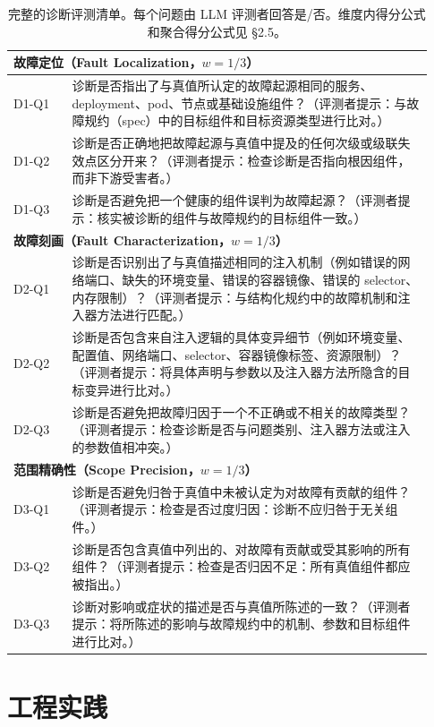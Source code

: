 \documentclass[11pt,UTF8,fontset=fandol]{ctexart}
\begin{document}
\begin{table}[H]\centering
\caption{完整的诊断评测清单。每个问题由 LLM 评测者回答是/否。维度内得分公式和聚合得分公式见 §2.5。}
\label{tab:6}
\renewcommand{\arraystretch}{1.25}
\begin{tabular}{p{0.13\linewidth}p{0.80\linewidth}}
\toprule
\multicolumn{2}{l}{\textbf{故障定位（Fault Localization，$w = 1/3$）}} \\
\midrule
D1-Q1 & 诊断是否指出了与真值所认定的故障起源相同的服务、deployment、pod、节点或基础设施组件？（评测者提示：与故障规约（spec）中的目标组件和目标资源类型进行比对。） \\
D1-Q2 & 诊断是否正确地把故障起源与真值中提及的任何次级或级联失效点区分开来？（评测者提示：检查诊断是否指向根因组件，而非下游受害者。） \\
D1-Q3 & 诊断是否避免把一个健康的组件误判为故障起源？（评测者提示：核实被诊断的组件与故障规约的目标组件一致。） \\
\midrule
\multicolumn{2}{l}{\textbf{故障刻画（Fault Characterization，$w = 1/3$）}} \\
\midrule
D2-Q1 & 诊断是否识别出了与真值描述相同的注入机制（例如错误的网络端口、缺失的环境变量、错误的容器镜像、错误的 selector、内存限制）？（评测者提示：与结构化规约中的故障机制和注入器方法进行匹配。） \\
D2-Q2 & 诊断是否包含来自注入逻辑的具体变异细节（例如环境变量、配置值、网络端口、selector、容器镜像标签、资源限制）？（评测者提示：将具体声明与参数以及注入器方法所隐含的目标变异进行比对。） \\
D2-Q3 & 诊断是否避免把故障归因于一个不正确或不相关的故障类型？（评测者提示：检查诊断是否与问题类别、注入器方法或注入的参数值相冲突。） \\
\midrule
\multicolumn{2}{l}{\textbf{范围精确性（Scope Precision，$w = 1/3$）}} \\
\midrule
D3-Q1 & 诊断是否避免归咎于真值中未被认定为对故障有贡献的组件？（评测者提示：检查是否过度归因：诊断不应归咎于无关组件。） \\
D3-Q2 & 诊断是否包含真值中列出的、对故障有贡献或受其影响的所有组件？（评测者提示：检查是否归因不足：所有真值组件都应被指出。） \\
D3-Q3 & 诊断对影响或症状的描述是否与真值所陈述的一致？（评测者提示：将所陈述的影响与故障规约中的机制、参数和目标组件进行比对。） \\
\bottomrule
\end{tabular}
\end{table}

\section{工程实践}
\end{document}
